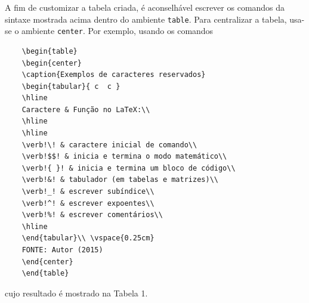 A fim de customizar a tabela criada, é aconselhável escrever os comandos da sintaxe mostrada acima dentro do ambiente \texttt{table}. Para centralizar a tabela, usa-se o ambiente \texttt{center}. Por exemplo, usando os comandos
\begin{verbatim}
	\begin{table}
	\begin{center}
	\caption{Exemplos de caracteres reservados}
	\begin{tabular}{ c  c }
	\hline
	Caractere & Função no LaTeX:\\
	\hline
	\hline
	\verb!\! & caractere inicial de comando\\
	\verb!$$! & inicia e termina o modo matemático\\
	\verb!{ }! & inicia e termina um bloco de código\\
	\verb!&! & tabulador (em tabelas e matrizes)\\
	\verb!_! & escrever subíndice\\
	\verb!^! & escrever expoentes\\
	\verb!%! & escrever comentários\\
	\hline
	\end{tabular}\\ \vspace{0.25cm}
	FONTE: Autor (2015)
	\end{center}
	\end{table}
\end{verbatim}
cujo resultado é mostrado na Tabela 1.


